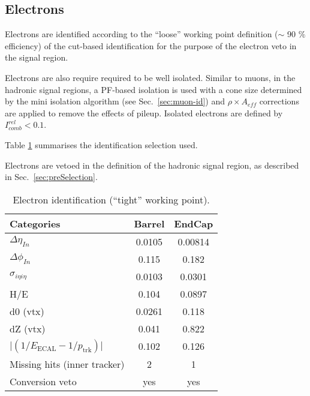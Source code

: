 \subsection{Electrons}
\label{sec:electron-id}
Electrons are identified according to the ``loose'' working point definition ($\sim$ 90 $\%$ efficiency) 
of the cut-based identification \cite{electron-id} for the purpose of the electron veto in the signal region.

Electrons are also require required to be well isolated. 
Similar to muons, in the hadronic signal regions, a PF-based isolation
\cite{pf-photon} is used with a cone size determined by the mini
isolation algorithm (see Sec.~\ref{sec:muon-id}) and $\rho\times A_{eff}$ 
corrections are applied to remove the effects of pileup.
Isolated electrons are defined by $I^{rel}_{comb} < 0.1$. 

Table \ref{tab:ele-id} summarises the identification 
selection used. 

Electrons are vetoed in the definition of the hadronic signal region, 
as described in Sec.~\ref{sec:preSelection}.


\begin{table}[h!]
  \caption{Electron identification (``tight'' working point).\label{tab:ele-id}}
  \centering
  \footnotesize
  \begin{tabular}{ lcc }
    \hline
    \hline
    Categories                                               & Barrel    & EndCap    \\
    \hline
    $\Delta \eta_{In}$                                       & 0.0105   & 0.00814  \\
    $\Delta \phi_{In}$                                       & 0.115    & 0.182  \\
    $\sigma_{i\eta i\eta}$                                   & 0.0103    & 0.0301  \\
    H/E                                                      & 0.104    & 0.0897   \\
    d0 (vtx)                                                 & 0.0261    & 0.118  \\
    dZ (vtx)                                                 & 0.041    & 0.822  \\
    $\lvert(1/E_{\textrm{ECAL}} - 1/p_{\textrm{trk}})\rvert$ & 0.102     & 0.126  \\
    Missing hits (inner tracker)                             & 2         & 1         \\
    Conversion veto                                          & yes       & yes   \\
    \hline
    \hline
  \end{tabular}
  \end{table}


